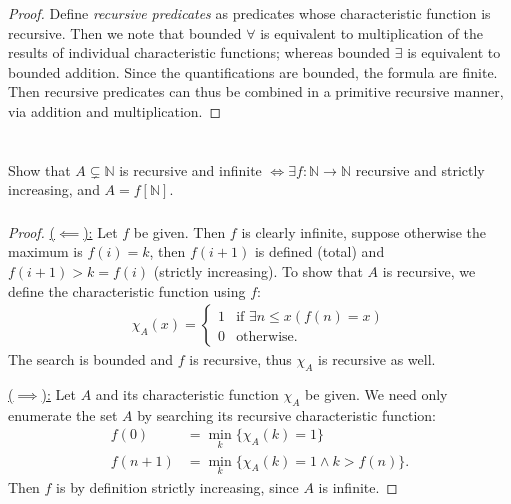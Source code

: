 \documentclass{article}
\theoremstyle{plain}
\newcommand{\N}{\mathbb{N}}
\begin{document}
\subsubsection{}
\begin{proof}
  Define \emph{recursive predicates} as predicates whose characteristic function
  is recursive. Then we note that bounded $\forall$ is equivalent to multiplication of
  the results of individual characteristic functions; whereas bounded $\exists$ is
  equivalent to bounded addition. Since the quantifications are bounded, the
  formula are finite. Then recursive predicates can thus be combined in a
  primitive recursive manner, via addition and multiplication.
\end{proof}

\section{}
Show that $A\subsetneq\N$ is recursive and infinite $\iff\exists f:\N\to\N$ recursive and strictly
increasing, and $A=f[\N]$.
\subsubsection{}
\begin{proof}
  \underline{($\impliedby$):} Let $f$ be given. Then $f$ is clearly infinite,
  suppose otherwise the maximum is $f(i) = k$, then $f(i+1)$ is defined (total)
  and $f(i+1) > k = f(i)$ (strictly increasing). To show that $A$ is recursive,
  we define the characteristic function using $f$:
\begin{align*}
\chi_{A}(x) = \begin{cases}
  1 &\text{if }\exists n\leq x(f(n) = x)\\
  0 &\text{otherwise.}
\end{cases}
\end{align*}
The search is bounded and $f$ is recursive, thus $\chi_{A}$ is recursive as well.

\medskip \underline{($\implies$):} Let $A$ and its characteristic function
$\chi_{A}$ be given. We need only enumerate the set $A$ by searching its recursive
characteristic function:
\begin{align*}
  f(0) &= \min_{k}\{ \chi_{A}(k) = 1 \}\\
  f(n+1) &= \min_{k}\{ \chi_{A}(k) = 1 \wedge k>f(n)\}.
\end{align*}
Then $f$ is by definition strictly increasing, since $A$ is infinite.
\end{proof}
\end{document}
